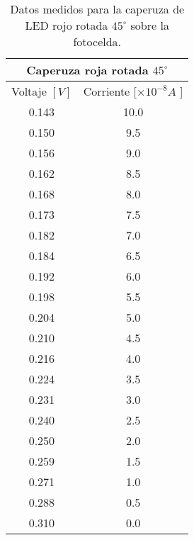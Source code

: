\begin{table}[H]
    \centering
    \resizebox{8cm}{!} {
    \begin{ruledtabular}
        
    
    \begin{tabular}{cc}
        \multicolumn{2}{c}{Caperuza roja rotada $45^\circ$}\\
        \hline
        Voltaje $[V]$ & Corriente [$\times 10^{-8} A$ ] \\ 
        \hline
        0.143 & 10.0 \\ 
        0.150 & 9.5 \\ 
        0.156 & 9.0 \\ 
        0.162 & 8.5 \\ 
        0.168 & 8.0 \\ 
        0.173 & 7.5 \\ 
        0.182 & 7.0 \\ 
        0.184 & 6.5 \\ 
        0.192 & 6.0 \\ 
        0.198 & 5.5 \\ 
        0.204 & 5.0 \\ 
        0.210 & 4.5 \\
        0.216 & 4.0 \\ 
        0.224 & 3.5 \\
        0.231 & 3.0 \\ 
        0.240 & 2.5 \\ 
        0.250 & 2.0 \\ 
        0.259 & 1.5 \\ 
        0.271 & 1.0 \\ 
        0.288 & 0.5 \\ 
        0.310 & 0.0 \\ \hline
    \end{tabular}
    \end{ruledtabular}
    }
    \caption{Datos medidos para la caperuza de LED rojo rotada $45^{\circ} $ sobre la fotocelda.}
    \label{table:datos_rc}
\end{table}